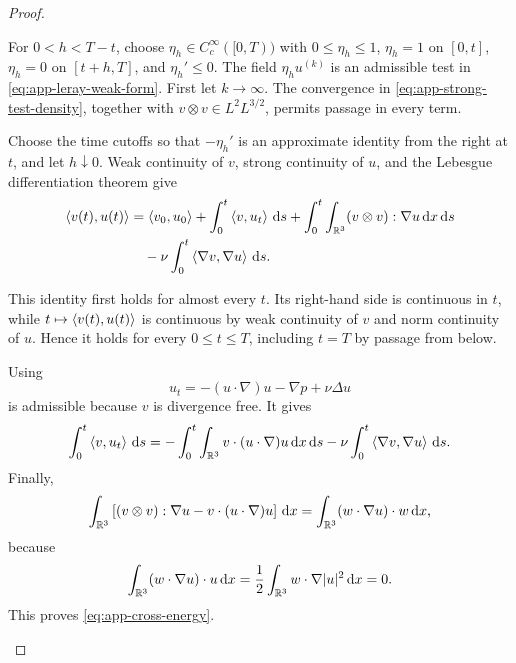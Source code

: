 \begin{proof}
\begin{samepage}
For \(0<h<T-t\), choose \(\eta_h\in C_c^\infty([0,T))\) with
\(0\le\eta_h\le1\), \(\eta_h=1\) on \([0,t]\),
\(\eta_h=0\) on \([t+h,T]\), and \(\eta_h'\le0\).  The field
\(\eta_hu^{(k)}\) is an admissible test in
\eqref{eq:app-leray-weak-form}.  First let \(k\to\infty\).
The convergence in \eqref{eq:app-strong-test-density}, together with
\(v\otimes v\in L^2L^{3/2}\), permits passage in every term.
\par
\end{samepage}
\begin{samepage}
Choose the time cutoffs so that \(-\eta_h'\) is an approximate identity from the right
at \(t\), and let \(h\downarrow0\).  Weak continuity of \(v\), strong
continuity of \(u\), and the Lebesgue differentiation theorem give
\begin{align*}
 \left\langle v(t),u(t)\right\rangle
 &=
 \left\langle v_0,u_0\right\rangle
 +\int_0^t\left\langle v,u_t\right\rangle\,\mathrm d s
 +\int_0^t\int_{\mathbb R^3}(v\otimes v):\nabla u\,\mathrm d x\,\mathrm d s\\
 &\quad-\nu\int_0^t\left\langle \nabla v,\nabla u\right\rangle\,\mathrm d s.
\end{align*}
\par
\end{samepage}
This identity first holds for almost every \(t\).  Its right-hand side is
continuous in \(t\), while \(t\mapsto\left\langle v(t),u(t)\right\rangle\) is continuous by
weak continuity of \(v\) and norm continuity of \(u\).  Hence it holds for
every \(0\le t\le T\), including \(t=T\) by passage from below.
\begin{samepage}
Using
\[
 u_t=-(u\cdot\nabla)u-\nabla p+\nu\Delta u
\]
is admissible because \(v\) is divergence free.  It gives
\[
 \int_0^t\left\langle v,u_t\right\rangle\,\mathrm d s
 =
 -\int_0^t\int_{\mathbb R^3}v\cdot(u\cdot\nabla)u\,\mathrm d x\,\mathrm d s
 -\nu\int_0^t\left\langle \nabla v,\nabla u\right\rangle\,\mathrm d s.
\]
Finally,
\[
 \int_{\mathbb R^3}
 \left[(v\otimes v):\nabla u-v\cdot(u\cdot\nabla)u\right]\,\mathrm d x
 =
 \int_{\mathbb R^3}(w\cdot\nabla u)\cdot w\,\mathrm d x,
\]
because
\[
 \int_{\mathbb R^3}(w\cdot\nabla u)\cdot u\,\mathrm d x
 =\frac12\int_{\mathbb R^3}w\cdot\nabla|u|^2\,\mathrm d x=0.
\]
This proves \eqref{eq:app-cross-energy}.
\end{samepage}
\end{proof}

